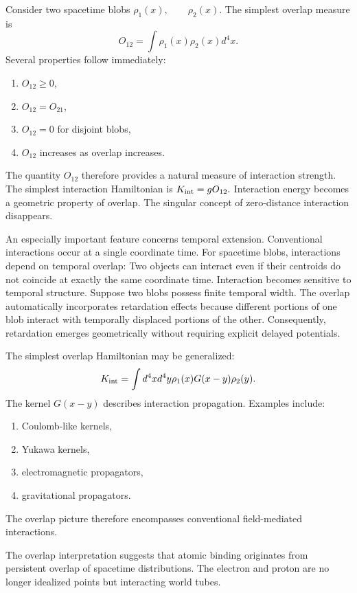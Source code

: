 Consider two spacetime blobs
$\rho_1(x),\qquad \rho_2(x).$
The simplest overlap measure is
\begin{equation}
    \label{blb-ovl}
O_{12} = \int \rho_1(x) \rho_2(x) d^4x.
\end{equation}
Several properties follow immediately:
\begin{enumerate}
\item $O_{12}\ge 0$,
\item $O_{12}=O_{21}$,
\item $O_{12}=0$ for disjoint blobs,
\item $O_{12}$ increases as overlap increases.
\end{enumerate}
The quantity $O_{12}$ therefore provides a natural measure of interaction strength.
The simplest interaction Hamiltonian is
$K_{\rm int} = g O_{12}.$
Interaction energy becomes a geometric property of overlap.
The singular concept of zero-distance interaction disappears.

An especially important feature concerns temporal extension.
Conventional interactions occur at a single coordinate time.
For spacetime blobs, interactions depend on temporal overlap:
Two objects can interact even if their centroids do not coincide at exactly the same coordinate time.
Interaction becomes sensitive to temporal structure.
Suppose two blobs possess finite temporal width.
The overlap automatically incorporates retardation effects because 
different portions of one blob interact with temporally displaced 
portions of the other.
Consequently, retardation emerges geometrically without requiring 
explicit delayed potentials.

The simplest overlap Hamiltonian may be generalized:
\[K_{\rm int} = \int d^4x d^4y \rho_1(x) G(x-y) \rho_2(y).\]
The kernel $G(x-y) $
describes interaction propagation.
Examples include:
\begin{enumerate}
\item Coulomb-like kernels,
\item Yukawa kernels,
\item electromagnetic propagators,
\item gravitational propagators.
\end{enumerate}
The overlap picture therefore encompasses conventional field-mediated interactions.

The overlap interpretation suggests that atomic binding originates from
persistent overlap of spacetime distributions.
The electron and proton are no longer idealized points but interacting 
world tubes.


